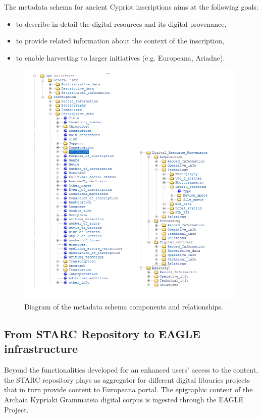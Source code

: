 \documentclass[amsthm,ebook]{saparticle}
\begin{document}
The metadata schema for ancient Cypriot inscriptions aims at the following goals:

\begin{itemize}
\item to describe in detail the digital resources and its digital provenance, 
\item to provide related information about the context of the inscription, 
\item to enable harvesting to larger initiatives (e.g. Europeana, Ariadne).
\end{itemize}



\begin{figure}[!bp]
\centering
 \includegraphics[width=\columnwidth]{DamnjanovicetalEAGLE2016-img005.pdf}
\caption{Diagram of the metadata schema components and relationships.}
\label{fig:5}
\end{figure}
  
  
\subsection{From STARC Repository to EAGLE infrastructure}


Beyond the functionalities developed for an enhanced users’ access to the content, the STARC repository plays as
aggregator for different digital libraries projects that in turn provide content to Europeana portal. The epigraphic
content of the Archaia Kypriaki Grammateia digital corpus is ingested through the EAGLE Project. 
\end{document}
